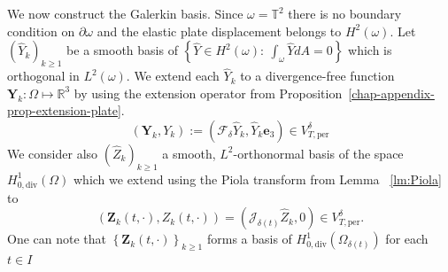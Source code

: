 \documentclass[10pt,a4paper]{article}
\numberwithin{equation}{section}
\begin{document}
We now construct the Galerkin basis. Since $\omega=\mathbb{T}^{2}$ there is no boundary condition on $\partial\omega$ and the elastic plate displacement belongs to $H^{2}(\omega)$. Let $(\hat{Y}_{k})_{k \ge 1}$ be a smooth basis of $\left\{ \hat{Y}\in H^{2}\left(\omega\right):\ \int_{\omega}\hat{Y}dA=0\right\} $ which is orthogonal in $L^{2} (\omega)$.  
We  extend each $\hat{Y}_k$ to a divergence-free function $\mathbf{Y}_k : \Omega \mapsto \mathbb{R}^{3}$ by using the extension operator from Proposition~\ref{chap-appendix-prop-extension-plate}.
\begin{equation}
\label{eq:Y}
\left(\mathbf{Y}_{k},Y_{k}\right):=\left(\mathcal{F}_{\delta}\hat{Y}_{k},\hat{Y}_{k}\mathbf{e}_{3}\right)\in V_{T,\text{per}}^{\delta}
\end{equation}
We consider also $(\hat{Z}_{k})_{k \ge 1}$ a smooth,  $L^{2}$-orthonormal basis of the space $H^{1}_{0, \text{div}}(\Omega)$ which we extend using the Piola transform from Lemma~ \ref{lm:Piola}
to \begin{equation}
\left(\mathbf{Z}_{k}\left(t,\cdot\right),Z_{k}\left(t,\cdot\right)\right)=\left(\mathcal{J}_{\mathcal{\delta}\left(t\right)}\hat{Z}_{k},0\right)\in V_{T,\text{per}}^{\delta}.
\end{equation}
One can note that $\left\{ \mathbf{Z}_{k}\left(t,\cdot\right)\right\} _{k\ge1}$ forms a basis of $H_{0,\text{div}}^{1}\left(\Omega_{\delta\left(t\right)}\right)$ for each $t\in I$
\end{document}
